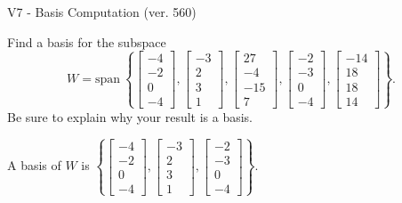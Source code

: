 \begin{exercise}
  \begin{exerciseTitle}V7 - Basis Computation (ver. 560)\end{exerciseTitle}
  \begin{exerciseStatement}
    Find a basis for the subspace 
\[W=\mathrm{span}\ \left\{\left[\begin{array}{r}
-4 \\
-2 \\
0 \\
-4
\end{array}\right] , \left[\begin{array}{r}
-3 \\
2 \\
3 \\
1
\end{array}\right] , \left[\begin{array}{r}
27 \\
-4 \\
-15 \\
7
\end{array}\right] , \left[\begin{array}{r}
-2 \\
-3 \\
0 \\
-4
\end{array}\right] , \left[\begin{array}{r}
-14 \\
18 \\
18 \\
14
\end{array}\right]\right\}.\]
 Be sure to explain why your result is a basis.


  \end{exerciseStatement}
  \begin{exerciseAnswer}
   A basis of \(W\) is  \(\left\{\left[\begin{array}{r}
-4 \\
-2 \\
0 \\
-4
\end{array}\right] , \left[\begin{array}{r}
-3 \\
2 \\
3 \\
1
\end{array}\right] , \left[\begin{array}{r}
-2 \\
-3 \\
0 \\
-4
\end{array}\right]\right\}\).
  


  \end{exerciseAnswer}
\end{exercise}